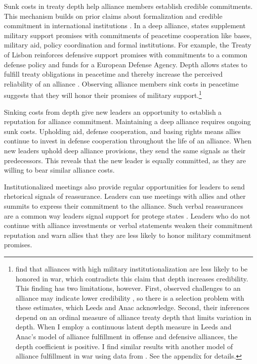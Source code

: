 \documentclass[12pt]{article}
\begin{document}
Sunk costs in treaty depth help alliance members establish credible commitments.
This mechanism builds on prior claims about formalization and credible commitment in international institutions \citep{Martin2005, SimmonsDanner2010, Mattes2012}. 
In a deep alliance, states supplement military support promises with commitments of peacetime cooperation like bases, military aid, policy coordination and formal institutions. 
For example, the Treaty of Lisbon reinforces defensive support promises with commitments to a common defense policy and funds for a European Defense Agency. 
Depth allows states to fulfill treaty obligations in peacetime and thereby increase the perceived reliability of an alliance \citep{Morrow1994}. 
Observing alliance members sink costs in peacetime suggests that they will honor their promises of military support.\footnote{\citet{LeedsAnac2005} find that alliances with high military institutionalization are less likely to be honored in war, which contradicts this claim that depth increases credibility. 
This finding has two limitations, however. 
First, observed challenges to an alliance may indicate lower credibility \citep{Smith1995}, so there is a selection problem with these estimates, which Leeds and Anac acknowledge. 
Second, their inferences depend on an ordinal measure of alliance treaty depth that limits variation in depth. 
When I employ a continuous latent depth measure in Leeds and Anac's model of alliance fulfillment in offense and defensive alliances, the depth coefficient is positive. 
I find similar results with another model of alliance fulfillment in war using data from \citet{BerkemeierFuhrmann2018}.
See the appendix for details.} 


Sinking costs from depth give new leaders an opportunity to establish a reputation for alliance commitment. 
Maintaining a deep alliance requires ongoing sunk costs.
Upholding aid, defense cooperation, and basing rights means allies continue to invest in defense cooperation throughout the life of an alliance. 
When new leaders uphold deep alliance provisions, they send the same signals as their predecessors. 
This reveals that the new leader is equally committed, as they are willing to bear similar alliance costs. 


Institutionalized meetings also provide regular opportunities for leaders to send rhetorical signals of reassurance.
Leaders can use meetings with allies and other summits to express their commitment to the alliance.
Such verbal reassurances are a common way leaders signal support for protege states \citep{McManusNieman2019, Blankenship2020}.
Leaders who do not continue with alliance investments or verbal statements weaken their commitment reputation and warn allies that they are less likely to honor military commitment promises.
\end{document}

